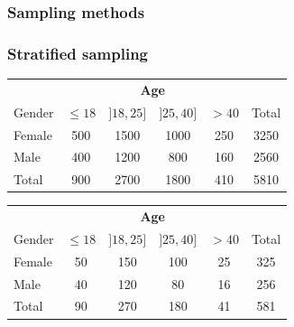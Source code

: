\documentclass{beamer}
\begin{document}
\begin{frame}
  \frametitle{Sampling methods}
  \begin{center}
  \end{center}

\end{frame}

\begin{frame}
\frametitle{Stratified sampling}

\begin{center}
    \begin{tabular}{l|cccc|c}
        & \multicolumn{4}{c|}{\textbf{Age}} & \\
        Gender & $\le 18$ & $]18,25]$ & $]25, 40]$ & $> 40$ & Total\\
        \hline
        Female & 500 & 1500 & 1000 & 250 & 3250 \\
        Male   & 400 & 1200 & 800 & 160 & 2560\\
        \hline
        Total  & 900 & 2700 & 1800 & 410 & 5810
    \end{tabular}
    
    \vspace{1cm}
    
    \pause
    \begin{tabular}{l|cccc|c}
        & \multicolumn{4}{c|}{\textbf{Age}} & \\
        Gender & $\le 18$ & $]18,25]$ & $]25, 40]$ & $> 40$ & Total\\
        \hline
        Female & 50 & 150 & 100 & 25 & 325 \\
        Male   & 40 & 120 & 80 & 16 & 256\\
        \hline
        Total & 90 & 270 & 180 & 41 & 581
    \end{tabular}
    
\end{center}
\end{frame}
\end{document}
